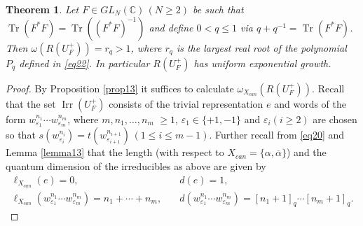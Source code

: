 \documentclass[11 pt, leqno]{amsart}
\newcommand{\eps}{\varepsilon}
\newcommand{\ov}{\overline}
\newcommand{\CC}{\mathbb{C}}
\DeclareMathOperator{\Irr}{Irr}
\DeclareMathOperator{\Tr}{Tr}
\newtheorem{theorem}{Theorem}[section]
\theoremstyle{definition}
\numberwithin{equation}{section}
\begin{document}
\begin{theorem}\label{thm2}
Let $F\in GL_N(\CC)\,(N\ge 2)$ be such that $\Tr(F^*F)=\Tr( (F^*F)^{-1})$ and define $0<q\le 1$ via $q+q^{-1}=\Tr(F^*F)$. Then $\omega(R(U_F^+))=r_q>1$, where $r_q$ is the largest real root of the polynomial $P_q$ defined in \eqref{eq22}. In particular $R(U_F^+)$ has uniform exponential growth.
\end{theorem}



\begin{proof}
By Proposition \ref{prop13} it suffices to calculate $\omega_{X_{can}}(R(U_F^+))$. Recall that the set $\Irr(U_F^+)$ consists of the trivial representation $e$ and words of the form $w^{n_1}_{\eps_1}\cdots w^{n_m}_{\eps_m}$, where $m,n_1,\dotsc,n_m$ $\ge 1$, $\eps_1\in \{+1,-1\}$ and $\eps_i(i\ge 2)$ are chosen so that $s(w^{n_i}_{\eps_i})=t(w^{n_{i+1}}_{\eps_{i+1}})\,(1\le i \le m-1)$. Further recall from \eqref{eq20} and Lemma \ref{lemma13} that the length (with respect to $X_{can}=\{\alpha,\ov\alpha\}$) and the quantum dimension of the irreducibles as above are given by 
\begin{equation}\label{eq23}
\begin{split}
\ell_{X_{can}}(e)=0,&\quad d(e)=1,\\
\ell_{X_{can}}(w^{n_1}_{\eps_1}\cdots w^{n_m}_{\eps_m}) =n_1+\cdots+n_m,&\quad 
d(w^{n_1}_{\eps_1}\cdots w^{n_m}_{\eps_m}) =
[n_1+1]_q\cdots [n_m+1]_q.
\end{split}\end{equation}


\end{proof}
\end{document}
